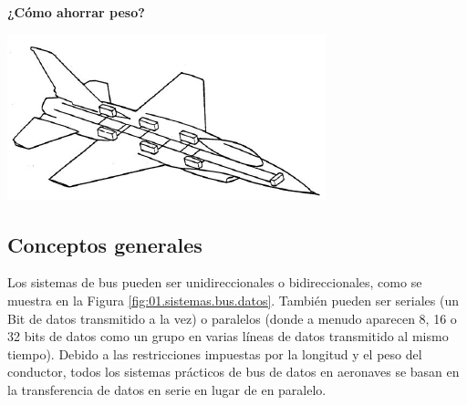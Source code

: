 \begin{myboxVerde}{\bf ¿C\'omo ahorrar peso? }
\begin{minipage}[c]{0.3\linewidth}
\end{minipage}\hspace{1.5em}
\begin{minipage}[c]{0.3\linewidth}
  \includegraphics[width=\linewidth]{01.tablero.instrumentos/imagenes/1.5.protocolos.buses.datos/9-avio+arquitectura+bus.png}
\end{minipage}

\end{myboxVerde}




\subsection{Conceptos generales}
\label{sec:01.05.01.01.conceptos.generales.buses}

Los sistemas de bus pueden ser unidireccionales  o bidireccionales, como se muestra en la Figura \ref{fig:01.sistemas.bus.datos}. 
También pueden ser seriales (un \ac{Bit} de datos transmitido a la vez) o paralelos (donde a menudo aparecen 8, 16 o 32 bits de datos como un grupo en varias líneas de datos transmitido al mismo tiempo). Debido a las restricciones impuestas por la longitud y el peso del conductor, todos los sistemas prácticos de bus de datos en aeronaves se basan en la transferencia de datos en serie en lugar de en paralelo.


